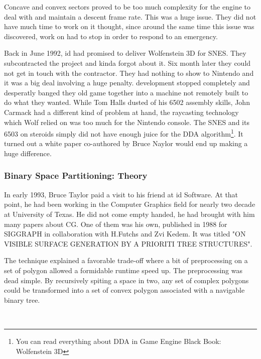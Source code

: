 Concave and convex sectors proved to be too much complexity for the engine to deal with and maintain a descent frame rate. This was a huge issue. They did not have much time to work on it thought, since around the same time this issue was discovered, work on \doom had to stop in order to respond to an emergency.\\
\par
Back in June 1992, id had promised to deliver Wolfenstein 3D for SNES. They subcontracted the project and kinda forgot about it. Six month later they could not get in touch with the contractor. They had nothing to show to Nintendo and it was a big deal involving a huge penalty.  \doom development stopped completely and desperatly banged they old game together into a machine not remotely built to do what they wanted. While Tom Halls dusted of his 6502 assembly skills, John Carmack had a different kind of problem at hand, the raycasting technology which Wolf relied on was too much for the Nintendo console. The SNES and its 6503 on steroids simply did not have enough juice for the DDA algorithm\footnote{You can read everything about DDA in Game Engine Black Book: Wolfenstein 3D}. It turned out a white paper co-authored by Bruce Naylor would end up making a huge difference.\\
\par




\subsubsection{Binary Space Partitioning: Theory}
In early 1993, Bruce Taylor paid a visit to his friend at id Software. At that point, he had been working in the Computer Graphics field for nearly two decade at University of Texas. He did not come empty handed, he had brought with him many papers about CG. One of them was his own, published in 1988 for SIGGRAPH in collaboration with H.Futchs and Zvi Kedem. It was titled "ON VISIBLE SURFACE GENERATION BY A PRIORITI TREE STRUCTURES".\\
\par
The technique explained a favorable trade-off where a bit of preprocessing on a set of polygon allowed a formidable runtime speed up. The preprocessing was dead simple. By recursively spiting a space in two, any set of complex polygons could be transformed into a set of convex polygon associated with a navigable binary tree.\\
\par
{}
\par
 \\
 \par

